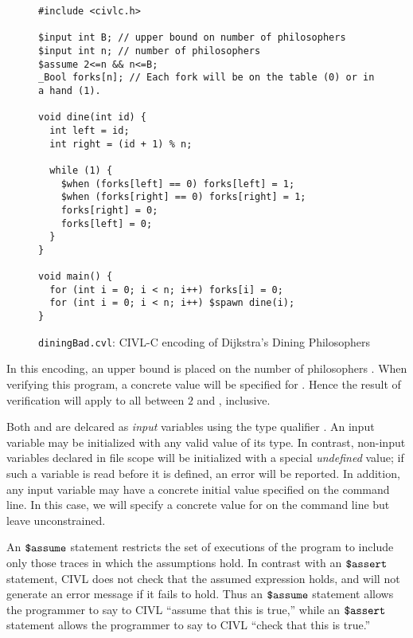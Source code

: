 \begin{figure}[t]
  \begin{small}
\begin{verbatim}
#include <civlc.h>

$input int B; // upper bound on number of philosophers
$input int n; // number of philosophers
$assume 2<=n && n<=B;
_Bool forks[n]; // Each fork will be on the table (0) or in a hand (1). 

void dine(int id) {
  int left = id;
  int right = (id + 1) % n;

  while (1) {
    $when (forks[left] == 0) forks[left] = 1;
    $when (forks[right] == 0) forks[right] = 1;
    forks[right] = 0;
    forks[left] = 0;
  }
}

void main() {
  for (int i = 0; i < n; i++) forks[i] = 0;
  for (int i = 0; i < n; i++) $spawn dine(i);
}
\end{verbatim}
  \end{small}
  \caption{\texttt{diningBad.cvl}: CIVL-C encoding of Dijkstra's Dining Philosophers}
  \label{fig:dining}
\end{figure}

In this encoding, an upper bound  is placed on the number of
philosophers .   When verifying this program, a concrete value
will be specified for .  Hence the result of verification will
apply to all  between $2$ and , inclusive.

Both  and  are delcared as \emph{input} variables using
the type qualifier \cinput.  An input variable may be
initialized with any valid value of its type.  In contrast, non-input
variables declared in file scope will be initialized with a
special \emph{undefined} value; if such a variable is read before it
is defined, an error will be reported. In addition, any input variable
may have a concrete initial value specified on the command line. In
this case, we will specify a concrete value for  on the command
line but leave  unconstrained.

An $\mbox{\texttt{\${}assume}}$ statement restricts the set of executions of the program
to include only those traces in which the assumptions hold. In
contrast with an $\mbox{\texttt{\${}assert}}$ statement, CIVL does not check that the
assumed expression holds, and will not generate an error message if it
fails to hold. Thus an $\mbox{\texttt{\${}assume}}$ statement allows the programmer to
say to CIVL ``assume that this is true,'' while an $\mbox{\texttt{\${}assert}}$
statement allows the programmer to say to CIVL ``check that this is
true.''

